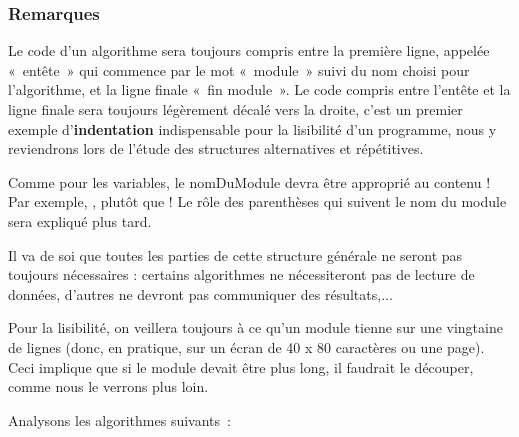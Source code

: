 
		\subsubsection*{Remarques}
		
		\begin{liste}
		\item {
			Le code d'un algorithme sera toujours compris entre la
			première ligne, appelée «~entête~» qui commence par 
			le mot «~module~»
			suivi du nom choisi pour l'algorithme, et la ligne
			finale «~fin module~». Le code compris entre l'entête
			et la ligne finale sera toujours légèrement décalé vers la droite,
			c'est un premier exemple
			d'\textbf{indentation} indispensable pour la
			lisibilité d'un programme, nous y reviendrons lors de
			l'étude des structures alternatives et répétitives.}
		\item {
			Comme pour les variables, le nomDuModule devra être approprié au contenu
			! Par exemple, , 
			 plutôt que 
			!
			Le rôle des parenthèses qui suivent le nom du module sera expliqué plus
			tard.}
		\item {
			Il va de soi que toutes les parties de cette structure générale ne
			seront pas toujours nécessaires : certains algorithmes ne nécessiteront
			pas de lecture de données, d'autres ne devront pas
			communiquer des résultats,...}
		\item {
			Pour la lisibilité, on veillera toujours à ce qu'un module
			tienne sur une vingtaine de lignes (donc, en pratique, sur un écran 
			de 40 x 80 caractères ou une page). Ceci implique que si le module 
			devait être plus long, il faudrait le découper, comme nous le verrons 
			plus loin.}
		\end{liste}

		\bigskip

		Analysons les algorithmes suivants~:
		
		
